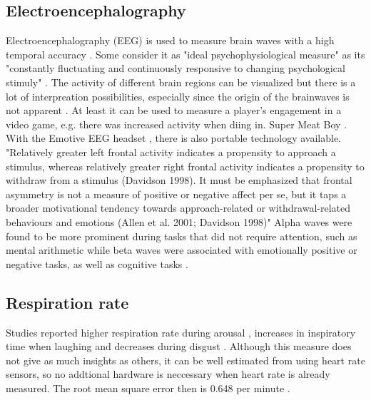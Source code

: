 \subsection{Electroencephalography}
Electroencephalography (EEG) is used to measure brain waves with a high temporal accuracy \cite{nacke2015physiological}. Some consider it as "ideal psychophysiological measure" as its "constantly fluctuating and continuously responsive to changing psychological stimuly" \cite{hatfield87psychophysiology}. The activity of different brain regions can be visualized but there is a lot of interpreation possibilities, especially since the origin of the brainwaves is not apparent \cite{nacke2015physiological}. At least it can be used to measure a player's engagement in a video game, e.g. there was increased activity when diing in. Super Meat Boy \cite{mcmahan2018evaluating}. With the Emotive EEG headset \cite{link_emotiv}, there is also portable technology available.
"Relatively greater left frontal activity indicates a propensity to approach a stimulus, whereas relatively greater right frontal activity indicates a propensity to withdraw from a stimulus (Davidson 1998). It must be emphasized that
frontal asymmetry is not a measure of positive or negative affect per se, but it taps a broader motivational tendency towards approach-related or withdrawal-related behaviours and emotions (Allen et al. 2001; Davidson 1998)" \cite{kivikangas2011review}
Alpha waves were found to be more prominent during tasks that did not require attention, such as mental arithmetic while beta waves were associated with emotionally positive or negative tasks, as well as cognitive tasks \cite{ray85eeg}.


\subsection{Respiration rate}
Studies reported higher respiration rate during arousal \cite{homma2008breathing}, increases in inspiratory time when laughing and decreases during disgust \cite{boiten1998effects}. Although this measure does not give as much insights as others, it can be well estimated from using heart rate sensors, so no addtional hardware is neccessary when heart rate is already measured. The root mean square error then is 0.648 per minute \cite{natarajan2021measurement}.

